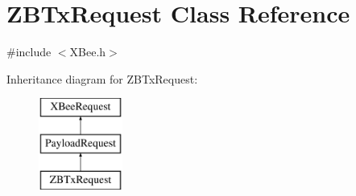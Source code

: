 \hypertarget{classZBTxRequest}{\section{\-Z\-B\-Tx\-Request \-Class \-Reference}
\label{classZBTxRequest}
}


{\ttfamily \#include $<$\-X\-Bee.\-h$>$}

\-Inheritance diagram for \-Z\-B\-Tx\-Request\-:\begin{figure}[H]
\begin{center}
\leavevmode
\includegraphics[height=3.000000cm]{classZBTxRequest}
\end{center}
\end{figure}
